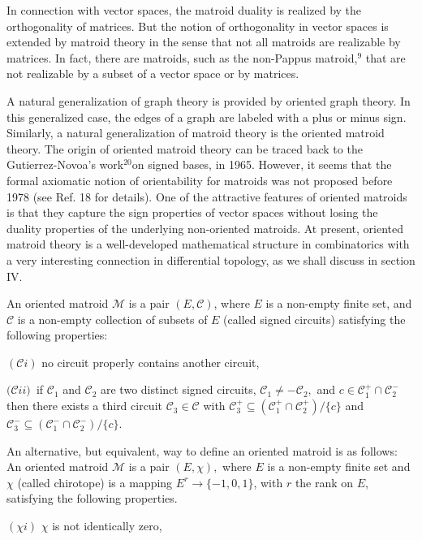 \documentclass[a4paper,12pt]{article}
\begin{document}
In connection with vector spaces, the matroid duality is realized by the
orthogonality of matrices. But the notion of orthogonality in vector spaces
is extended by matroid theory in the sense that not all matroids are
realizable by matrices. In fact, there are matroids, such as the non-Pappus
matroid,$^{9}$ that are not realizable by a subset of a vector space or by
matrices.

A natural generalization of graph theory is provided by oriented graph
theory. In this generalized case, the edges of a graph are labeled with a
plus or minus sign. Similarly, a natural generalization of matroid theory is
the oriented matroid theory. The origin of oriented matroid theory can be
traced back to the Gutierrez-Novoa's work$^{20}$on signed bases, in 1965.
However, it seems that the formal axiomatic notion of orientability for
matroids was not proposed before 1978 (see Ref. 18 for details). One of the
attractive features of oriented matroids is that they capture the sign
properties of vector spaces without losing the duality properties of the
underlying non-oriented matroids. At present, oriented matroid theory is a
well-developed mathematical structure in combinatorics with a very
interesting connection in differential topology, as we shall discuss in
section IV.

An oriented matroid $\mathcal{M}$ is a pair $(E,\mathcal{C})$, where $E$ is
a non-empty finite set, and $\mathcal{C}$ is a non-empty collection of
subsets of $E$ (called signed circuits) satisfying the following properties:

$(\mathcal{C}\mathit{i})$ no circuit properly contains another circuit,

$(\mathcal{C}\mathit{ii)}$\textit{\ }if $\mathcal{C}_{1}$ and $\mathcal{C}%
_{2}$ are two distinct signed circuits, $\mathcal{C}_{1}\neq -\mathcal{C}%
_{2},$ and $c\in \mathcal{C}_{1}^{+}\cap \mathcal{C}_{2}^{-}$ then there
exists a third circuit $\mathcal{C}_{3}\in \mathcal{C}$ with $\mathcal{C}%
_{3}^{+}\subseteq (\mathcal{C}_{1}^{+}\cap \mathcal{C}_{2}^{+})/\{c\}$ and $%
\mathcal{C}_{3}^{-}\subseteq (\mathcal{C}_{1}^{-}\cap \mathcal{C}%
_{2}^{-})/\{c\}$.

An alternative, but equivalent, way to define an oriented matroid is as
follows: An oriented matroid $\mathcal{M}$ is a pair $(E,\chi ),$ where $E$
is a non-empty finite set and $\chi $ (called chirotope) is a mapping $%
E^{r}\rightarrow \{-1,0,1\}$, with $r$ the rank on $E$, satisfying the
following properties.

$(\chi i)$ $\chi $ is not identically zero,
\end{document}
